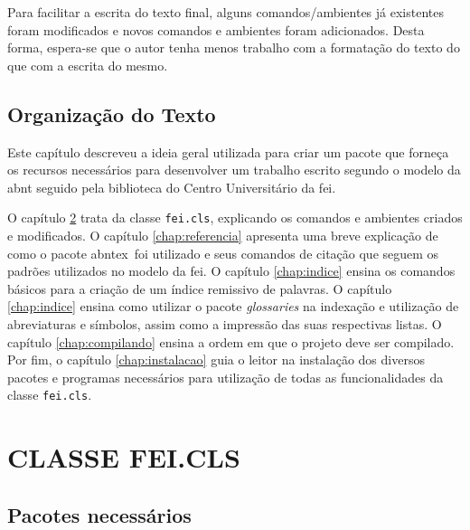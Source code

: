 \documentclass[xindy,rascunho]{fei}
\begin{document}
Para facilitar a escrita do texto final, alguns comandos/ambientes já existentes foram modificados e novos comandos e ambientes foram adicionados. Desta forma, espera-se que o autor tenha menos trabalho com a formatação do texto do que com a escrita do mesmo.

\section{Organização do Texto}

Este capítulo descreveu a ideia geral utilizada para criar um pacote que forneça os recursos necessários para desenvolver um trabalho escrito segundo o modelo da \gls{abnt} seguido pela biblioteca do Centro Universitário da \gls{fei}.

O capítulo \ref{chap:classe} trata da classe \texttt{fei.cls}, explicando os comandos e ambientes criados e modificados. O capítulo \ref{chap:referencia} apresenta uma breve explicação de como o pacote \gls{abntex}~foi utilizado e seus comandos de citação que seguem os padrões utilizados no modelo da \gls{fei}. O capítulo \ref{chap:indice} ensina os comandos básicos para a criação de um índice remissivo de palavras. O capítulo \ref{chap:indice} ensina como utilizar o pacote \emph{glossaries} na indexação e utilização de abreviaturas e símbolos, assim como a impressão das suas respectivas listas. O capítulo \ref{chap:compilando} ensina a ordem em que o projeto deve ser compilado. Por fim, o capítulo \ref{chap:instalacao} guia o leitor na instalação dos diversos pacotes e programas necessários para utilização de todas as funcionalidades da classe \texttt{fei.cls}.

\chapter{CLASSE FEI.CLS}\label{chap:classe}

\section{Pacotes necessários}\label{sec:pacotes}
    
\end{document}

